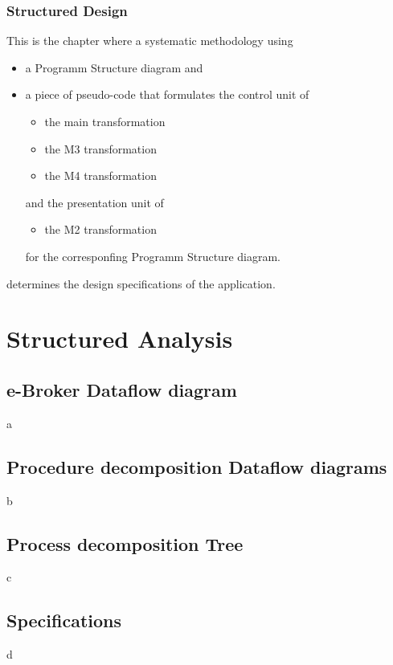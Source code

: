 \documentclass{article}
\begin{document}
\subsubsection{Structured Design}
This is the chapter where a systematic methodology using
\begin{itemize}
\item a Programm Structure diagram and 
\item a piece of pseudo-code that formulates the control unit of
\begin{itemize}[{label=$\circ$}]
\item the main transformation 
\item the M3 transformation 
\item the M4 transformation
\end{itemize}
and the presentation unit of
\begin{itemize}[{label=$\circ$}]
\item the M2 transformation 
\end{itemize}
for the corresponfing Programm Structure diagram.
\end{itemize}
determines the design specifications of the application. 

\newpage
\section{Structured Analysis}
\subsection{e-Broker Dataflow diagram}
a

\subsection{Procedure decomposition Dataflow diagrams}
b

\subsection{Process decomposition Tree}
c

\subsection{Specifications}
d
\end{document}
